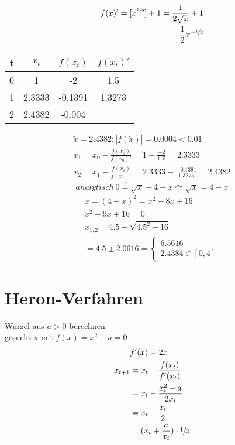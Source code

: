 \documentclass[14pt,a4paper]{extarticle}
\begin{document}

	\begin{eqnarray*}
		f(x)'=[x^{\sfrac{1}{2}}] + 1 = \frac{1}{2\sqrt{x}} + 1 \\
		\frac{1}{2}x^{-\sfrac{1}{2}}
	\end{eqnarray*}

	\begin{table}[h!]
  		\centering
  		\label{tab:table1}
  		\begin{tabular}{c | c c c}
    		t & ${x_t}$ & $f(x_t)$ & $f(x_t)'$\\
    		\hline
    		0 & 1 & -2 & 1.5\\
    		1 & 2.3333 & -0.1391 & 1.3273\\
    		2 & 2.4382 & -0.004 & \\
  		\end{tabular}
	\end{table}
	\begin{eqnarray}
	\tilde{x} = 2.4382 : |f(\tilde{x})|=0.0004 < 0.01 \\
	x_1=x_0 - \frac{f(x_0)}{f(x_0)'} = 1 - \frac{-2}{1,5} = 2.3333 \\
	x_2=x_1 - \frac{f(x_1)}{f(x_1)'} = 2.3333 - \frac{-0.1391}{1.3273}	= 2.4382
	\end{eqnarray}
	\begin{equation}
	analytisch \ 0 \stackrel{!}{=} \sqrt{x}-4+x
	\curvearrowright \sqrt{x} = 4-x	
	\end{equation}		
	\setcounter{equation}{0}
	\begin{eqnarray}
	x = (4-x)^2=x^2-8x+16 \\
	x^2 -9x + 16 = 0 \\
	x_{1,2}=4.5\pm\sqrt{4.5^2-16} \\
	=4.5\pm 2.0616=
    \begin{cases}
		6.5616  \\
		2.4384 \in [0,4]
	\end{cases}	
	\end{eqnarray}
	\setcounter{equation}{0}
	\section{Heron-Verfahren}
	Wurzel aus \begin{math} a > 0 \end{math} berechnen \\
	gesucht x mit \begin{math} f(x) = x^2 - a = 0 \end{math}
	\begin{align*}
	&f'(x)=2x \\
	x_{t+1}&=x_t-\frac{f(x_t)}{f'(x_t)} \\
	&=x_t-\frac{x_t^2-a}{2x_t} \\
	&=x_t-\frac{x_t}{2} \\
	&=(x_t+\frac{a}{x_t})\cdot\sfrac{1}{2}
	\end{align*}
\end{document}
